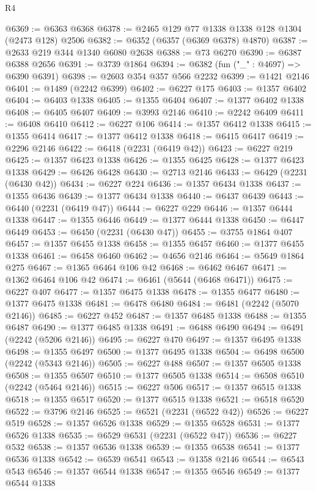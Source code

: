 \begin{lexlean}{R4}
\begin{coremodule}
@6369 := @6363 @6368
@6378 := @2465 @129 @77 @1338 @1338 @128 @1304 (@2473 @128) @2506
@6382 := @6352 (@6357 (@6369 @6378) @4870)
@6387 := @2633 @219 @344 @1340 @6080 @2638
@6388 := @73 @6270
@6390 := @6387 @6388 @2656
@6391 := @3739 @1864
@6394 := @6382 (fun ("_" : @4697) => @6390 @6391)
@6398 := @2603 @354 @357 @566 @2232
@6399 := @1421 @2146
@6401 := @1489 (@2242 @6399)
@6402 := @6227 @175
@6403 := @1357 @6402
@6404 := @6403 @1338
@6405 := @1355 @6404
@6407 := @1377 @6402 @1338
@6408 := @6405 @6407
@6409 := @3993 @2146
@6410 := @2242 @6409
@6411 := @6408 @6410
@6412 := @6227 @106
@6414 := @1357 @6412 @1338
@6415 := @1355 @6414
@6417 := @1377 @6412 @1338
@6418 := @6415 @6417
@6419 := @2296 @2146
@6422 := @6418 (@2231 (@6419 @42))
@6423 := @6227 @219
@6425 := @1357 @6423 @1338
@6426 := @1355 @6425
@6428 := @1377 @6423 @1338
@6429 := @6426 @6428
@6430 := @2713 @2146
@6433 := @6429 (@2231 (@6430 @42))
@6434 := @6227 @224
@6436 := @1357 @6434 @1338
@6437 := @1355 @6436
@6439 := @1377 @6434 @1338
@6440 := @6437 @6439
@6443 := @6440 (@2231 (@6419 @47))
@6444 := @6227 @229
@6446 := @1357 @6444 @1338
@6447 := @1355 @6446
@6449 := @1377 @6444 @1338
@6450 := @6447 @6449
@6453 := @6450 (@2231 (@6430 @47))
@6455 := @3755 @1864 @407
@6457 := @1357 @6455 @1338
@6458 := @1355 @6457
@6460 := @1377 @6455 @1338
@6461 := @6458 @6460
@6462 := @4656 @2146
@6464 := @5649 @1864 @275
@6467 := @1365 @6464 @106 @42
@6468 := @6462 @6467
@6471 := @1362 @6464 @106 @42
@6474 := @6461 (@5644 (@6468 @6471))
@6475 := @6227 @407
@6477 := @1357 @6475 @1338
@6478 := @1355 @6477
@6480 := @1377 @6475 @1338
@6481 := @6478 @6480
@6484 := @6481 (@2242 (@5070 @2146))
@6485 := @6227 @452
@6487 := @1357 @6485 @1338
@6488 := @1355 @6487
@6490 := @1377 @6485 @1338
@6491 := @6488 @6490
@6494 := @6491 (@2242 (@5206 @2146))
@6495 := @6227 @470
@6497 := @1357 @6495 @1338
@6498 := @1355 @6497
@6500 := @1377 @6495 @1338
@6504 := @6498 @6500 (@2242 (@5343 @2146))
@6505 := @6227 @488
@6507 := @1357 @6505 @1338
@6508 := @1355 @6507
@6510 := @1377 @6505 @1338
@6514 := @6508 @6510 (@2242 (@5464 @2146))
@6515 := @6227 @506
@6517 := @1357 @6515 @1338
@6518 := @1355 @6517
@6520 := @1377 @6515 @1338
@6521 := @6518 @6520
@6522 := @3796 @2146
@6525 := @6521 (@2231 (@6522 @42))
@6526 := @6227 @519
@6528 := @1357 @6526 @1338
@6529 := @1355 @6528
@6531 := @1377 @6526 @1338
@6535 := @6529 @6531 (@2231 (@6522 @47))
@6536 := @6227 @532
@6538 := @1357 @6536 @1338
@6539 := @1355 @6538
@6541 := @1377 @6536 @1338
@6542 := @6539 @6541
@6543 := @1358 @2146
@6544 := @6543 @543
@6546 := @1357 @6544 @1338
@6547 := @1355 @6546
@6549 := @1377 @6544 @1338

\end{coremodule}
\end{lexlean}
